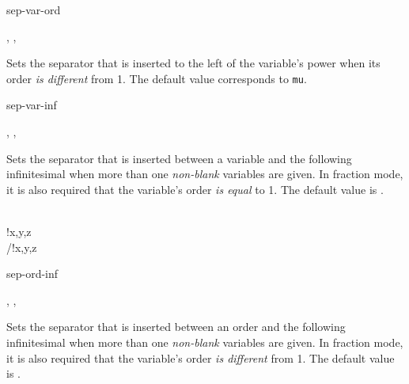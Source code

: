 \begin{option}{sep-var-ord}
	\begin{values}[default = 0]
		, , 
	\end{values}
	Sets the separator that is inserted to the left of the variable's power when its order \emph{is different} from \num{1}. The default value corresponds to  \texttt{mu}.
	\begin{example}
	\end{example}
\end{option}

\begin{option}{sep-var-inf}
	\begin{values}[default = \cs{mathop}\{\}\cs{!}]
		, , \marg{delimiter}
	\end{values}
	Sets the separator that is inserted between a variable and the following infinitesimal when more than one \emph{non-blank} variables are given. In fraction mode, it is also required that the variable's order \emph{is equal} to \num{1}. The default value is \val{\default}.
	\begin{example}
		\pdv[sep-var-inf=\here, order=n]{f}{x,y,z}\\
		!{x,y,z}\\
		/!{x,y,z}
	\end{example}
\end{option}

\begin{option}{sep-ord-inf}
	\begin{values}[default = \cs{mathop}\{\}\cs{!}]
		, , 
	\end{values}
	Sets the separator that is inserted between an order and the following infinitesimal when more than one \emph{non-blank} variables are given. In fraction mode, it is also required that the variable's order \emph{is different} from \num{1}. The default value is .
	\begin{example}
		\pdv[sep-ord-inf=\here, order=n]{f}{x,y,z}
	\end{example}
\end{option}

